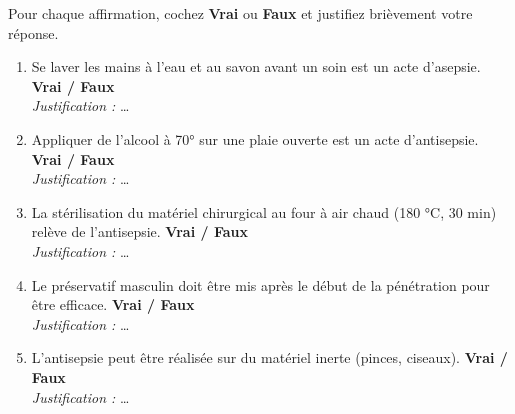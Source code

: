 \documentclass[11pt]{article}
\begin{document}
\begin{exercice}
Pour chaque affirmation, cochez \textbf{Vrai} ou \textbf{Faux} et justifiez brièvement votre réponse.
\begin{enumerate}
    \item Se laver les mains à l'eau et au savon avant un soin est un acte d'asepsie. \hfill \textbf{Vrai / Faux} \\
    \textit{Justification :} \ldots
    \item Appliquer de l'alcool à 70° sur une plaie ouverte est un acte d'antisepsie. \hfill \textbf{Vrai / Faux} \\
    \textit{Justification :} \ldots
    \item La stérilisation du matériel chirurgical au four à air chaud (180 °C, 30 min) relève de l'antisepsie. \hfill \textbf{Vrai / Faux} \\
    \textit{Justification :} \ldots
    \item Le préservatif masculin doit être mis après le début de la pénétration pour être efficace. \hfill \textbf{Vrai / Faux} \\
    \textit{Justification :} \ldots
    \item L'antisepsie peut être réalisée sur du matériel inerte (pinces, ciseaux). \hfill \textbf{Vrai / Faux} \\
    \textit{Justification :} \ldots
\end{enumerate}
\end{exercice}
\end{document}
